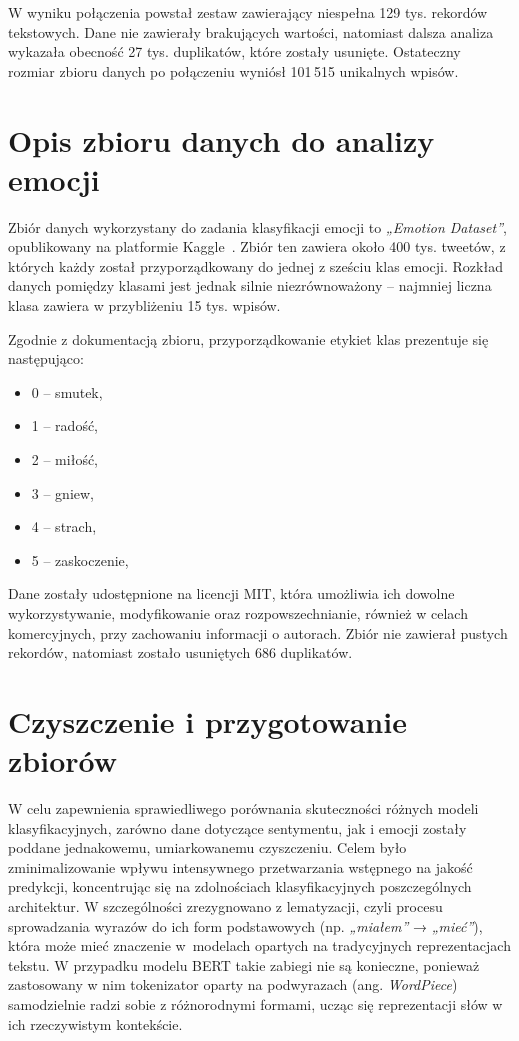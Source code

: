 W wyniku połączenia powstał zestaw zawierający niespełna 129 tys. rekordów tekstowych. Dane nie zawierały brakujących wartości, natomiast dalsza analiza wykazała obecność 27 tys. duplikatów, które zostały usunięte. Ostateczny rozmiar zbioru danych po połączeniu wyniósł 101\,515 unikalnych wpisów.

\section{Opis zbioru danych do analizy emocji}

Zbiór danych wykorzystany do zadania klasyfikacji emocji to \textit{„Emotion Dataset”}, opublikowany na platformie Kaggle~\cite{EmotionDs}. Zbiór ten zawiera około 400 tys. tweetów, z których każdy został przyporządkowany do jednej z sześciu klas emocji. Rozkład danych pomiędzy klasami jest jednak silnie niezrównoważony -- najmniej liczna klasa zawiera w przybliżeniu 15 tys. wpisów.

Zgodnie z dokumentacją zbioru, przyporządkowanie etykiet klas prezentuje się następująco:
\begin{itemize}
    \item 0 -- smutek,
    \item 1 -- radość,
    \item 2 -- miłość,
    \item 3 -- gniew,
    \item 4 -- strach,
    \item 5 -- zaskoczenie,
\end{itemize}

Dane zostały udostępnione na licencji MIT, która umożliwia ich dowolne wykorzystywanie, modyfikowanie oraz rozpowszechnianie, również w celach komercyjnych, przy zachowaniu informacji o autorach. Zbiór nie zawierał pustych rekordów, natomiast zostało usuniętych 686 duplikatów.

\newpage
\section{Czyszczenie i przygotowanie zbiorów}

W celu zapewnienia sprawiedliwego porównania skuteczności różnych modeli klasyfikacyjnych, zarówno dane dotyczące sentymentu, jak i emocji zostały poddane jednakowemu, umiarkowanemu czyszczeniu. Celem było zminimalizowanie wpływu intensywnego przetwarzania wstępnego na jakość predykcji, koncentrując się na zdolnościach klasyfikacyjnych poszczególnych architektur. W szczególności zrezygnowano z lematyzacji, czyli procesu sprowadzania wyrazów do ich form podstawowych (np. \textit{„miałem”} → \textit{„mieć”}), która może mieć znaczenie w~modelach opartych na tradycyjnych reprezentacjach tekstu. W przypadku modelu BERT takie zabiegi nie są konieczne, ponieważ zastosowany w nim tokenizator oparty na podwyrazach (ang. \textit{WordPiece}) samodzielnie radzi sobie z różnorodnymi formami, ucząc się reprezentacji słów w ich rzeczywistym kontekście.

